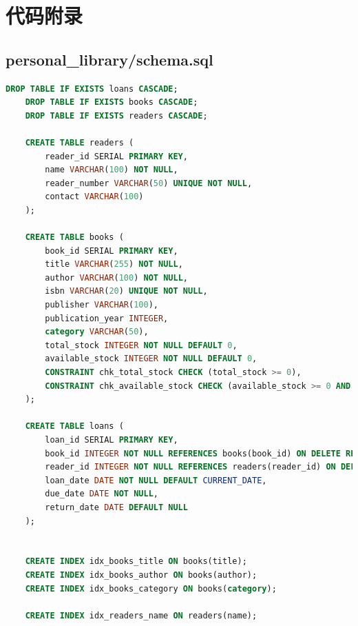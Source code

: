 \documentclass[11pt, a4paper]{article}
\begin{document}
\newpage
\appendix
{} %

\section{代码附录}
\label{sec:appendix_code}

\subsection{personal\_library/schema.sql}
\label{subsec:schema_sql_code}
\begin{lstlisting}[language=SQL, style=sqlstyle, caption={personal\_library/schema.sql SQL脚本}, label={lst:schema_sql}]
    DROP TABLE IF EXISTS loans CASCADE;
    DROP TABLE IF EXISTS books CASCADE;
    DROP TABLE IF EXISTS readers CASCADE;
    
    CREATE TABLE readers (
        reader_id SERIAL PRIMARY KEY,
        name VARCHAR(100) NOT NULL,
        reader_number VARCHAR(50) UNIQUE NOT NULL,
        contact VARCHAR(100)
    );
    
    CREATE TABLE books (
        book_id SERIAL PRIMARY KEY,
        title VARCHAR(255) NOT NULL,
        author VARCHAR(100) NOT NULL,
        isbn VARCHAR(20) UNIQUE NOT NULL,
        publisher VARCHAR(100),
        publication_year INTEGER,
        category VARCHAR(50),
        total_stock INTEGER NOT NULL DEFAULT 0,
        available_stock INTEGER NOT NULL DEFAULT 0,
        CONSTRAINT chk_total_stock CHECK (total_stock >= 0), 
        CONSTRAINT chk_available_stock CHECK (available_stock >= 0 AND available_stock <= total_stock)
    );
    
    CREATE TABLE loans (
        loan_id SERIAL PRIMARY KEY,
        book_id INTEGER NOT NULL REFERENCES books(book_id) ON DELETE RESTRICT,
        reader_id INTEGER NOT NULL REFERENCES readers(reader_id) ON DELETE RESTRICT,
        loan_date DATE NOT NULL DEFAULT CURRENT_DATE,
        due_date DATE NOT NULL,
        return_date DATE DEFAULT NULL
    );
    
    
    CREATE INDEX idx_books_title ON books(title);
    CREATE INDEX idx_books_author ON books(author);
    CREATE INDEX idx_books_category ON books(category);
    
    CREATE INDEX idx_readers_name ON readers(name);
    

\end{lstlisting}
\end{document}

